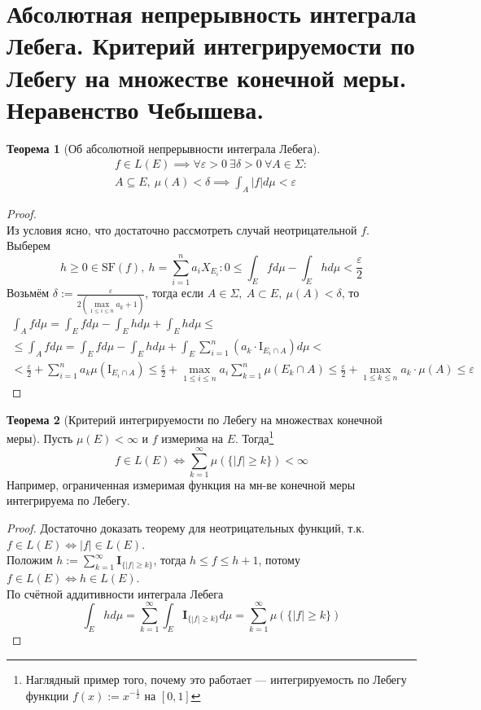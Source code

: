 \documentclass[11pt,a4paper]{report}
\def\eps{\varepsilon}
\theoremstyle{definition}
\theoremstyle{definition}
\newtheorem{theorem}{Теорема}[section]
\theoremstyle{definition}
\begin{document}
	\section{Абсолютная непрерывность интеграла Лебега. Критерий интегрируемости по Лебегу на множестве конечной меры. Неравенство Чебышева.}
	\begin{theorem}[Об абсолютной непрерывности интеграла Лебега]		
		\begin{gather*} 
			f \in L(E) \implies \forall \eps > 0\ \exists \delta > 0\ \forall A \in \Sigma:\\ 
			A \subseteq E,\ \mu(A) < \delta \implies \int_{A} |f| d\mu < \eps 
		\end{gather*}
	\end{theorem}
	\begin{proof}$  $\\
		Из условия ясно, что достаточно рассмотреть случай неотрицательной $ f $.
		Выберем 
		\[ h \ge 0 \in \mbox{SF}(f),\ h = \sum\limits_{i=1}^{n}a_{i} X_{E_{i}}: 0 \le \int_{E} f d\mu - \int_{E} h d\mu < \frac{\eps}{2} \]
		Возьмём $ \delta := \frac{\eps}{2 \left (\max\limits_{1 \le i \le n} a_{k} + 1\right )} $, тогда если $ A \in \Sigma,\ A \subset E,\ \mu(A) < \delta $, то 
		\begin{gather*}
			\int_{A} f d\mu = \int_{E} f d\mu - \int_{E} h d\mu + \int_{E} h d\mu \le\\\le \int_{A} f d\mu = \int_{E} f d\mu - \int_{E} h d\mu + \int_{E} \sum_{i=1}^{n} (a_{k} \cdot \mbox{I}_{E_{i} \cap A}) d\mu <\\< \frac{\eps}{2} + \sum_{i=1}^{n} a_{k} \mu(\mbox{I}_{E_{i} \cap A}) \le \frac{\eps}{2} + \max\limits_{1 \le i \le n} a_{i} \sum\limits_{k=1}^{n} \mu(E_{k} \cap A) \le \frac{\eps}{2} + \max\limits_{1 \le k \le n} a_{k} \cdot \mu(A) \le \eps
		\end{gather*}
	\end{proof}
	\begin{theorem}[Критерий интегрируемости по Лебегу на множествах конечной меры]
		Пусть $ \mu(E) < \infty $ и $ f $ измерима на $ E $. Тогда\footnote{Наглядный пример того, почему это работает — интегрируемость по Лебегу функции $ f(x) := x^{-\frac{1}{2}} $ на $ [0, 1] $ } 
		\[ f \in L(E) \iff \sum\limits_{k=1}^{\infty} \mu(\{ |f| \ge k \}) < \infty \]
		Например, ограниченная измеримая функция на мн-ве конечной меры интегрируема по Лебегу.
	\end{theorem}
	\begin{proof}
		Достаточно доказать теорему для неотрицательных функций, т.к. $ f \in L(E) \iff |f| \in L(E) $.\\
		Положим $ h := \sum\limits_{k=1}^{\infty} \mathbf{I}_{\{ |f| \ge k \}} $, тогда $ h \le f \le h+1 $, потому $ f \in L(E) \iff h \in L(E) $.\\
		По счётной аддитивности интеграла Лебега
		\[
			\int_{E} h d\mu = \sum\limits_{k=1}^{\infty} \int_{E} \mathbf{I}_{\{ |f| \ge k \}} d\mu = \sum\limits_{k=1}^{\infty} \mu(\{ |f| \ge k \})
		\]
	\end{proof}
\end{document}
